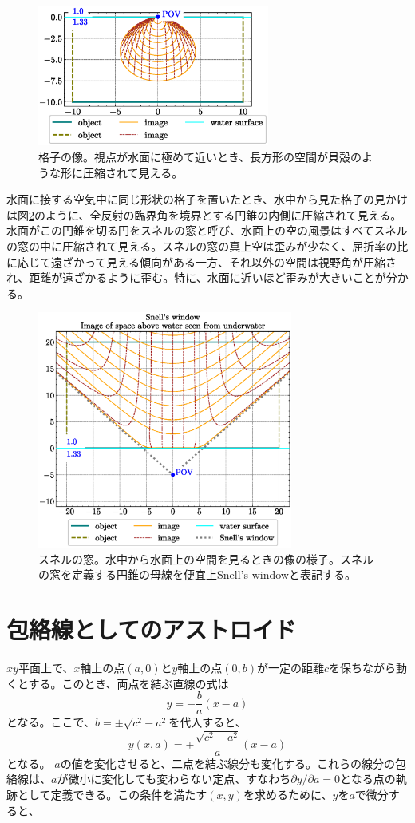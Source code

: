 \documentclass[twocolumn]{article}
\begin{document}
\begin{figure}[!t]
	\centering
	\includegraphics[width=3in]{figs/seashell_shape.eps}
	\caption{格子の像。視点が水面に極めて近いとき、長方形の空間が貝殻のような形に圧縮されて見える。}
	\label{fig:seashell}
\end{figure}

水面に接する空気中に同じ形状の格子を置いたとき、水中から見た格子の見かけは図\ref{fig:snell_window}のように、全反射の臨界角を境界とする円錐の内側に圧縮されて見える。水面がこの円錐を切る円をスネルの窓と呼び、水面上の空の風景はすべてスネルの窓の中に圧縮されて見える。スネルの窓の真上空は歪みが少なく、屈折率の比に応じて遠ざかって見える傾向がある一方、それ以外の空間は視野角が圧縮され、距離が遠ざかるように歪む。特に、水面に近いほど歪みが大きいことが分かる。

\begin{figure}
	\centering
	\includegraphics[width=3.3in]{figs/snell_window.eps}
	\caption{スネルの窓。水中から水面上の空間を見るときの像の様子。スネルの窓を定義する円錐の母線を便宜上Snell's windowと表記する。}
	\label{fig:snell_window}
\end{figure}

	
\appendix
\newcommand{\pd}[2]{{\frac{\partial #1}{\partial #2}}}
\newcommand{\ilpd}[2]{{{\partial #1}/{\partial #2}}}
\section{包絡線としてのアストロイド} \label{app:astroid}
$xy$平面上で、$x$軸上の点$(a, 0)$と$y$軸上の点$(0, b)$が一定の距離$c$を保ちながら動くとする。このとき、両点を結ぶ直線の式は
$$y=-\dfrac{b}{a}(x-a)$$
となる。ここで、$b=\pm \sqrt{c^2-a^2}$を代入すると、
$$y(x, a) = \mp \dfrac{\sqrt{c^2-a^2}}{a}(x-a)$$
となる。
$a$の値を変化させると、二点を結ぶ線分も変化する。これらの線分の包絡線は、$a$が微小に変化しても変わらない定点、すなわち$\ilpd{y}{a} = 0$となる点の軌跡として定義できる。この条件を満たす$(x, y)$を求めるために、$y$を$a$で微分すると、
\end{document}
